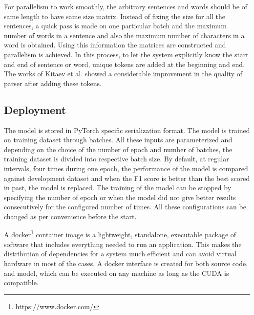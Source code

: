\documentclass[a4paper, 11pt]{article}
\begin{document}
For parallelism to work smoothly, the arbitrary sentences and words should be of same length to have same size matrix. Instead of fixing the size for all the sentences, a quick pass is made on one particular batch and the maximum number of words in a sentence and also the maximum number of characters in a word is obtained. Using this information the matrices are constructed and parallelism is achieved. In this process, to let the system explicitly know the start and end of sentence or word, unique tokens are added at the beginning and end. The works of  Kitaev et al. \parencite*{Kitaev2019} showed a considerable improvement in the quality of parser after adding these tokens.

\subsection{Deployment}

The model is stored in PyTorch specific serialization format. The model is trained on training dataset through batches. All these inputs are parameterized and depending on the choice of the number of epoch and number of batches, the training dataset is divided into respective batch size. By default, at regular intervals, four times during one epoch, the performance of the model is compared against development dataset and when the F1 score is better than the best scored in past, the model is replaced. The training of the model can be stopped by specifying the number of epoch or when the model did not give better results consecutively for the configured number of times. All these configurations can be changed as per convenience before the start. 

A docker\footnote{https://www.docker.com/} container image is a lightweight, standalone, executable package of software that includes everything needed to run an application. This makes the distribution of dependencies for a system much efficient and can avoid virtual hardware in most of the cases. A docker interface is created for both source code, and model, which can be executed on any machine as long as the CUDA is compatible. 



\end{document}
